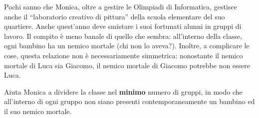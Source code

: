 \usepackage{xcolor}
\usepackage{afterpage}
\usepackage{pifont,mdframed}
\usepackage[bottom]{footmisc}



\newcommand{\inputfile}{\texttt{input.txt}}
\newcommand{\outputfile}{\texttt{output.txt}}

\newenvironment{warning}
  {\par\begin{mdframed}[linewidth=2pt,linecolor=gray]%
    \begin{list}{}{\leftmargin=1cm
                   \labelwidth=\leftmargin}\item[\Large\ding{43}]}
  {\end{list}\end{mdframed}\par}

\newcommand{\funcitem}[2]{\item[$\blacksquare$] \textbf{\large \textsf{Funzione} \texttt{#1}} \vspace{-0.3cm} \begin{center}\begin{tabularx}{\textwidth}{|c|X|} \hline #2 \hline \end{tabularx}\end{center}}


Pochi sanno che Monica, oltre a gestire le Olimpiadi di Informatica, gestisce anche il ``laboratorio creativo di pittura'' della scuola elementare del suo quartiere. Anche quest'anno deve smistare i suoi fortunati alunni in gruppi di lavoro. Il compito è meno banale di quello che sembra: all'interno della classe, ogni bambino ha un nemico mortale (chi non lo aveva?). Inoltre, a complicare le cose, questa relazione non è necessariamente simmetrica: nonostante il nemico mortale di Luca sia Giacomo, il nemico mortale di Giacomo potrebbe non essere Luca.

Aiuta Monica a dividere la classe nel \textbf{minimo} numero di gruppi, in modo che all'interno di ogni gruppo non siano presenti contemporaneamente un bambino ed il suo nemico mortale.


